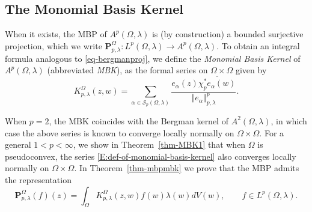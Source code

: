\documentclass[letterpaper,11pt,reqno]{amsart}
\theoremstyle{plain}
\theoremstyle{definition}
\theoremstyle{remark}
\theoremstyle{remark}
\numberwithin{equation}{section}
\newcommand{\norm}[1]{\left\Vert#1\right\Vert}
\newcommand{\ol}{\overline}
\begin{document}
\subsection{The Monomial Basis Kernel}\label{SS:MBK}   
When it exists, the MBP of $A^p(\Omega,\lambda)$ is (by construction) a bounded surjective projection, which we write $\bm{P}^\Omega_{p,\lambda}: L^p(\Omega, \lambda)\to A^p(\Omega, \lambda)$.
To obtain an integral formula analogous to \eqref{eq-bergmanproj}, we define the \emph{Monomial Basis Kernel} of $A^p(\Omega,\lambda)$ (abbreviated \emph{MBK}), as the formal series on $\Omega \times \Omega$ given by
\begin{equation}\label{E:def-of-monomial-basis-kernel}
K_{p,\lambda}^\Omega(z,w) =\sum_{\alpha\in \mathcal{S}_p(\Omega, \lambda) }\frac{e_\alpha(z) \ol{\chi_p^*e_\alpha(w)}} {\norm{e_\alpha}_{p,\lambda}^p}. 
\end{equation}

When $p=2$, the MBK coincides with the Bergman kernel of $A^2(\Omega,\lambda)$, in which case the above series is known to converge locally normally on $\Omega \times \Omega$. 
For a general $1<p<\infty$, we show in Theorem~\ref{thm-MBK1} that when $\Omega$ is pseudoconvex, the series \eqref{E:def-of-monomial-basis-kernel} also converges locally normally on $\Omega \times \Omega$.
In Theorem~\ref{thm-mbpmbk} we prove that the MBP admits the representation
\begin{equation}\label{eq-MBPintegral}
\bm{P}_{p,\lambda}^\Omega(f)(z) = \int_\Omega  K_{p,\lambda}^\Omega(z,w) f(w) \lambda(w) dV(w), \qquad f \in L^p(\Omega,\lambda).
\end{equation}
\end{document}
